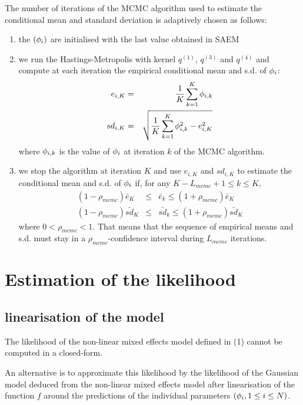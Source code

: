 The number of iterations of the MCMC algorithm used to estimate the conditional mean and standard deviation is adaptively chosen as follows:
\begin{enumerate}
  \item the $({\phi}_i)$ are initialised with the last value obtained in SAEM
  \item we run the Hastings-Metropolis with kernel $q^{(1)}$, $q^{(3)}$ and $q^{(4)}$ and compute at each iteration the empirical conditional mean and s.d. of ${\phi}_i$:
  \begin{eqnarray}
  e_{i,K} &= &\frac{1}{K}\sum_{k=1}^K {\phi}_{i,k} \\
  sd_{i,K} &= &\sqrt{\frac{1}{K}\sum_{k=1}^K {\phi}_{i,k}^2 - e_{i,K}^2 }
  \end{eqnarray}
  where ${\phi}_{i,k}$ is the value of ${\phi}_i$ at iteration $k$ of the MCMC algorithm.
  \item we stop the algorithm at iteration $K$ and use $e_{i,K}$ and $sd_{i,K}$ to estimate the conditional mean and s.d. of ${\phi}_i$ if, for any $ K-L_{mcmc}+1 \leq k \leq K$,
  \begin{eqnarray}
  \label{Lmcmc}  (1-\rho_{mcmc})\bar{e}_K & \leq & \bar{e}_k \leq  (1+\rho_{mcmc})\bar{e}_{K} \\
  \nonumber  (1-\rho_{mcmc})\bar{sd}_{K} & \leq & \bar{sd}_{k} \leq  (1+\rho_{mcmc})\bar{sd}_{K}
  \end{eqnarray}
where $0<\rho_{mcmc}<1$. That means that the sequence of empirical means and s.d. must stay in a $\rho_{mcmc}$-confidence interval during $L_{mcmc}$ iterations.
\end{enumerate}

\section{Estimation of the likelihood} \label{estilik}
\subsection{linearisation of the model}
The likelihood of the non-linear mixed effects model defined in (1) cannot be computed in a closed-form.

An alternative is  to approximate this likelihood  by the likelihood of the Gaussian model deduced from the non-linear mixed
effects model after linearisation of the function $f$ around
the predictions of the individual parameters $({{\phi}_i}, 1\leq i \leq N) $.

